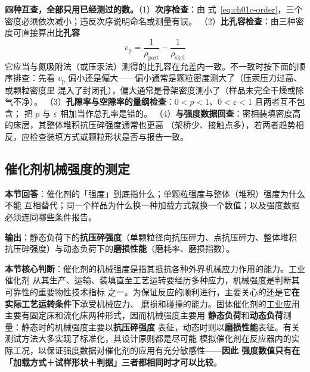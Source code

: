 \begin{crosscheck}
\textbf{四种互查，全部只用已经测过的数。}（1）\textbf{次序检查}：由
式~\eqref{eq:ch01c-order}，三个密度必须依次减小；违反次序说明命名或测量有误。
（2）\textbf{比孔容检查}：由三种密度可直接算出\textbf{比孔容}
\begin{equation}\label{eq:ch01c-vp}
v_{\mathrm{p}}=\frac{1}{\rho_{\mathrm{part}}}-\frac{1}{\rho_{\mathrm{skel}}}
\end{equation}
它应当与氮吸附法（或压汞法）测得的比孔容在允差内一致。不一致时按下面的顺序排查：先看
$v_{\mathrm{p}}$ 偏小还是偏大——偏小通常是颗粒密度测大了（压汞压力过高、或颗粒密度里
混入了封闭孔），偏大通常是骨架密度测小了（样品未完全干燥或除气不净）。
（3）\textbf{孔隙率与空隙率的量纲检查}：$0<p<1$、$0<\varepsilon<1$ 且两者互不包含；
把 $p$ 与 $\varepsilon$ 相加当作总孔率是错的。
（4）\textbf{与强度数据回查}：密相装填密度高的床层，其整体堆积抗压碎强度通常也更高
（架桥少、接触点多），若两者趋势相反，应检查装填方式或颗粒形状是否与报告一致。
\end{crosscheck}

\subsection{催化剂机械强度的测定}

\begin{probout}
\textbf{本节回答}：催化剂的「强度」到底指什么；单颗粒强度与整体（堆积）强度为什么不能
互相替代；同一个样品为什么换一种加载方式就换一个数值；以及强度数据必须连同哪些条件报告。

\textbf{输出}：静态负荷下的\textbf{抗压碎强度}（单颗粒径向抗压碎力、点抗压碎力、整体堆积
抗压碎强度）与动态负荷下的\textbf{磨损性能}（磨耗率、磨损指数）。

\textbf{本节核心判断}：催化剂的机械强度是指其抵抗各种外界机械应力作用的能力。工业催化剂
从其生产、运输、装填直至工艺运转要经历多种应力，机械强度是判断其可靠性的重要物性技术指标
之一。为保证反应的顺利进行，主要关心的还是它\textbf{在实际工艺运转条件下}承受机械应力、
磨损和碰撞的能力。固体催化剂的工业应用主要有固定床和流化床两种形式，因而机械强度主要用
\textbf{静态负荷}和\textbf{动态负荷}测量：静态时的机械强度主要以\textbf{抗压碎强度}
表征，动态时则以\textbf{磨损性能}表征。有关测试方法大多实现了标准化，其设计原则都是尽可能
模拟催化剂在反应器内的实际工况，以保证强度数据对催化剂的应用有充分敏感性——\textbf{因此
强度数值只有在「加载方式＋试样形状＋判据」三者都相同时才可以比较}。
\end{probout}

